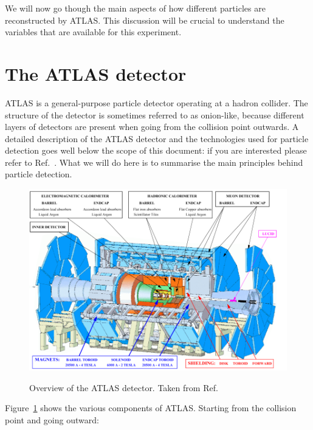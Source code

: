 
We will now go though the main aspects of how different particles are reconstructed by ATLAS. This discussion will be crucial to understand the variables that are available for this experiment. 

\section{The ATLAS detector}

ATLAS is a general-purpose particle detector operating at a hadron collider. The structure of the detector is sometimes referred to as onion-like, because different layers of detectors are present when going from the collision point outwards. A detailed description of the ATLAS detector and the technologies used for particle detection goes well below the scope of this document: if you are interested please refer to Ref.~\cite{Aad:2008zzm}. What we will do here is to summarise the main principles behind particle detection.

\begin{figure}[tb] 
	\centering
	\includegraphics[width=0.7\columnwidth]{Figures/atlas.png}
	\label{fig:ATLAS}
	\caption{Overview of the ATLAS detector. Taken from Ref.~\cite{ATLAS_detector_image}}
\end{figure}

Figure~\ref{fig:ATLAS} shows the various components of ATLAS. Starting from the collision point and going outward: 

